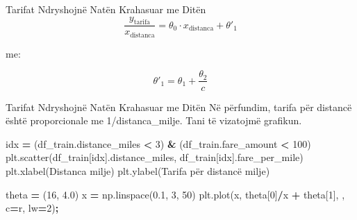 \documentclass[
  ignorenonframetext,
]{beamer}
\newenvironment{Shaded}{\begin{snugshade}}{\end{snugshade}}
\newcommand{\DecValTok}[1]{\textcolor[rgb]{0.00,0.00,0.81}{#1}}
\newcommand{\FloatTok}[1]{\textcolor[rgb]{0.00,0.00,0.81}{#1}}
\newcommand{\NormalTok}[1]{#1}
\newcommand{\OperatorTok}[1]{\textcolor[rgb]{0.81,0.36,0.00}{\textbf{#1}}}
\newcommand{\StringTok}[1]{\textcolor[rgb]{0.31,0.60,0.02}{#1}}
\begin{document}
\begin{frame}{Tarifat Ndryshojnë Natën Krahasuar me Ditën}
\protect\hypertarget{tarifat-ndryshojnuxeb-natuxebn-krahasuar-me-dituxebn-6}{}
\[
\frac{y_{\text{tarifa}}}{x_{\text{distanca}}} = \theta_0 \cdot x_{\text{distanca}} + \theta'_1
\]

me:

\[
\theta'_1 = \theta_1 + \frac{\theta_2}{c}
\]
\end{frame}

\begin{frame}[fragile]{Tarifat Ndryshojnë Natën Krahasuar me Ditën}
\protect\hypertarget{tarifat-ndryshojnuxeb-natuxebn-krahasuar-me-dituxebn-7}{}
Në përfundim, tarifa për distancë është proporcionale me
1/distanca\_milje. Tani të vizatojmë grafikun.


\begin{Shaded}
\begin{Highlighting}[]
\NormalTok{idx }\OperatorTok{=}\NormalTok{ (df\_train.distance\_miles }\OperatorTok{\textless{}} \DecValTok{3}\NormalTok{) }\OperatorTok{\&}\NormalTok{ (df\_train.fare\_amount }\OperatorTok{\textless{}} \DecValTok{100}\NormalTok{)}
\NormalTok{plt.scatter(df\_train[idx].distance\_miles, df\_train[idx].fare\_per\_mile)}
\NormalTok{plt.xlabel(}\StringTok{\textquotesingle{}Distanca milje\textquotesingle{}}\NormalTok{)}
\NormalTok{plt.ylabel(}\StringTok{\textquotesingle{}Tarifa për distancë milje\textquotesingle{}}\NormalTok{)}

\NormalTok{theta }\OperatorTok{=}\NormalTok{ (}\DecValTok{16}\NormalTok{, }\FloatTok{4.0}\NormalTok{)}
\NormalTok{x }\OperatorTok{=}\NormalTok{ np.linspace(}\FloatTok{0.1}\NormalTok{, }\DecValTok{3}\NormalTok{, }\DecValTok{50}\NormalTok{)}
\NormalTok{plt.plot(x, theta[}\DecValTok{0}\NormalTok{]}\OperatorTok{/}\NormalTok{x }\OperatorTok{+}\NormalTok{ theta[}\DecValTok{1}\NormalTok{], }\StringTok{\textquotesingle{}{-}{-}\textquotesingle{}}\NormalTok{, c}\OperatorTok{=}\StringTok{\textquotesingle{}r\textquotesingle{}}\NormalTok{, lw}\OperatorTok{=}\DecValTok{2}\NormalTok{)}\OperatorTok{;}
\end{Highlighting}
\end{Shaded}
\end{frame}
\end{document}
